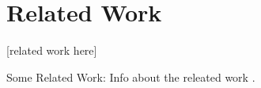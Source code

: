 \section{Related Work}
\label{section:relatedwork}
[related work here]

\begin{description}
  \item{Some Related Work:} Info about the releated work \cite{SomeRelatedWork}.
\end{description}

